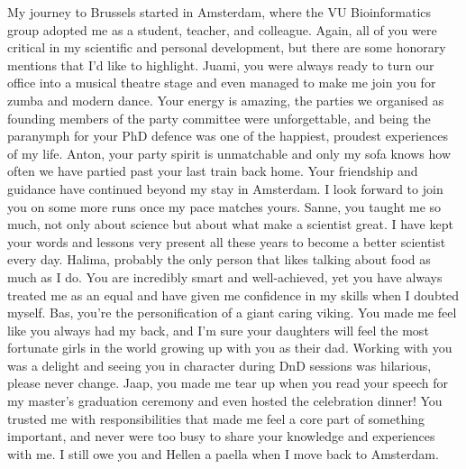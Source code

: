 My journey to Brussels started in Amsterdam, where the VU Bioinformatics group adopted me as a student, teacher, and colleague. Again, all of you were critical in my scientific and personal development, but there are some honorary mentions that I'd like to highlight. Juami, you were always ready to turn our office into a musical theatre stage and even managed to make me join you for zumba and modern dance. Your energy is amazing, the parties we organised as founding members of the party committee were unforgettable, and being the paranymph for your PhD defence was one of the happiest, proudest experiences of my life. Anton, your party spirit is unmatchable and only my sofa knows how often we have partied past your last train back home. Your friendship and guidance have continued beyond my stay in Amsterdam. I look forward to join you on some more runs once my pace matches yours. Sanne, you taught me so much, not only about science but about what make a scientist great. I have kept your words and lessons very present all these years to become a better scientist every day. Halima, probably the only person that likes talking about food as much as I do. You are incredibly smart and well-achieved, yet you have always treated me as an equal and have given me confidence in my skills when I doubted myself. Bas, you're the personification of a giant caring viking. You made me feel like you always had my back, and I'm sure your daughters will feel the most fortunate girls in the world growing up with you as their dad. Working with you was a delight and seeing you in character during DnD sessions was hilarious, please never change. Jaap, you made me tear up when you read your speech for my master's graduation ceremony and even hosted the celebration dinner! You trusted me with responsibilities that made me feel a core part of something important, and never were too busy to share your knowledge and experiences with me. I still owe you and Hellen a paella when I move back to Amsterdam. 

